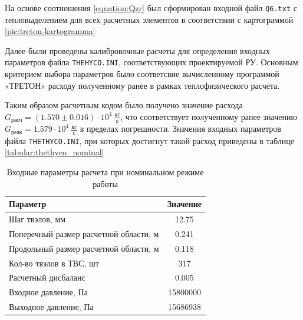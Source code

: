 На основе соотношения \ref{equation:Qzr} был сформирован входной файл \texttt{Q6.txt} с тепловыделением для всех расчетных элементов в соответствии с картограммой \ref{pic:treton-kartogramma}

Далее были проведены калибровочные расчеты для определения входных параметров файла \texttt{THEHYCO.INI}, соответствующих проектируемой РУ. Основным критерием выбора параметров было соответсвие вычисленному программой «ТРЕТОН» расходу полученному ранее в рамках теплофизического расчета.

Таким образом расчетным кодом было получено значение расхода $G_{\text{расч}} = (1.570 \pm 0.016) \cdot 10^4\  \frac{\text{кг}}{\text{с}}$, что соответствует полученному ранее значению $G_{\text{реак}} = 1.579 \cdot 10^4\ \frac{\text{кг}}{\text{с}}$ в пределах погрешности. 
Значения входных параметров файла \texttt{THETHYCO.INI}, при которых достигнут такой расход приведены в таблице \ref{tabular:thethyco_nominal}

\begin{table}[H]
    \caption{Входные параметры расчета при номинальном режиме работы}
    \begin{center}
        \begin{tabular}{|l|c|}
        \toprule
        Параметр & Значение \\
        \midrule
        \hline
        Шаг твэлов, мм & 12.75 \\ 
        \hline
        Поперечный размер расчетной области, м & 0.241 \\
        \hline
        Продольный размер расчетной области, м & 0.118 \\
        \hline
        Кол-во твэлов в ТВС, шт & 317 \\
        \hline
        Расчетный дисбаланс & 0.005 \\
        \hline
        Входное давление, Па & 15800000 \\
        \hline
        Выходное давление, Па & 15686938 \\
        \bottomrule
        \end{tabular}
		\label{tabular:thehyco_nominal}
    \end{center}
\end{table}


